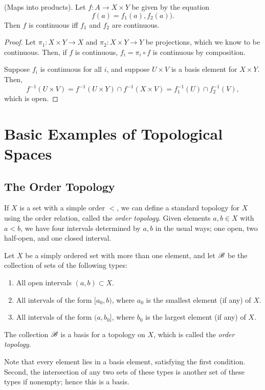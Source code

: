 \documentclass[10pt]{report}
\begin{document}
\begin{theorem}
  {\normalfont (Maps into products).} Let $f:A \rightarrow X \times Y$ be given by the equation
  \[
  f(a) = f_1(a),f_2(a)).
  \]
  Then $f$ is continuous iff $f_1$ and $f_2$ are continuous.
\end{theorem}
\begin{proof}
  Let $\pi_1:X \times Y \rightarrow X$ and $\pi_2:X \times Y \rightarrow Y$ be projections, which we know to be continuous.
  Then, if $f$ is continuous, $f_i = \pi_i \circ f$ is continuous by composition.

  Suppose $f_i$ is continuous for all $i$, and suppose $U \times V$ is a basis element for $X \times Y$.
  Then,
  \[
    f^{-1}(U \times V)
    = f^{-1}(U \times Y) \cap f^{-1}(X \times V)
    = f_1^{-1}(U) \cap f_2^{-1}(V),
  \]
  which is open.
\end{proof}

\newpage
\section{Basic Examples of Topological Spaces}
\subsection{The Order Topology}
If $X$ is a set with a simple order $<$, we can define a standard topology for $X$ using the order relation, called the \emph{order topology}.
Given elements $a,b \in X$ with $a<b$, we have four intervals determined by $a,b$ in the usual ways; one open, two half-open, and one closed interval.
\begin{definition}
  Let $X$ be a simply ordered set with more than one element, and let $\mathscr{B}$ be the collection of sets of the following types:
  \begin{enumerate}[label={(\arabic*)}]
    \item All open intervals $(a,b) \subset X$.
    \item All intervals of the form $[a_0,b)$, where $a_0$ is the smallest element (if any) of $X$.
    \item All intervals of the form $(a,b_0]$, where $b_0$ is the largest element (if any) of $X$.
  \end{enumerate}
  The collection $\mathscr{B}$ is a basis for a topology on $X$, which is called the \emph{order topology}.
\end{definition}
Note that every element lies in a basis element, satisfying the first condition.  
Second, the intersection of any two sets of these types is another set of these types if nonempty; hence this is a basis.
\end{document}
